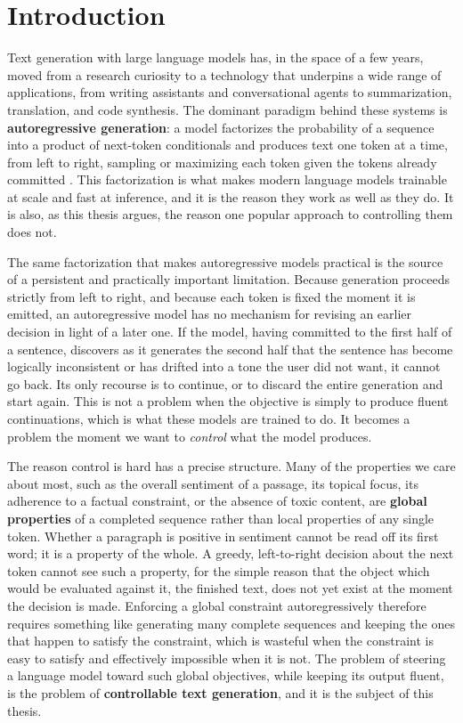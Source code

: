 \section{Introduction}
\label{ch:introduction}

Text generation with large language models has, in the space of a few years, moved from a research curiosity to a technology that underpins a wide range of applications, from writing assistants and conversational agents to summarization, translation, and code synthesis. The dominant paradigm behind these systems is \textbf{autoregressive generation}: a model factorizes the probability of a sequence into a product of next-token conditionals and produces text one token at a time, from left to right, sampling or maximizing each token given the tokens already committed \citep{radford2019language, brown2020language}. This factorization is what makes modern language models trainable at scale and fast at inference, and it is the reason they work as well as they do. It is also, as this thesis argues, the reason one popular approach to controlling them does not.

The same factorization that makes autoregressive models practical is the source of a persistent and practically important limitation. Because generation proceeds strictly from left to right, and because each token is fixed the moment it is emitted, an autoregressive model has no mechanism for revising an earlier decision in light of a later one. If the model, having committed to the first half of a sentence, discovers as it generates the second half that the sentence has become logically inconsistent or has drifted into a tone the user did not want, it cannot go back. Its only recourse is to continue, or to discard the entire generation and start again. This is not a problem when the objective is simply to produce fluent continuations, which is what these models are trained to do. It becomes a problem the moment we want to \emph{control} what the model produces.

The reason control is hard has a precise structure. Many of the properties we care about most, such as the overall sentiment of a passage, its topical focus, its adherence to a factual constraint, or the absence of toxic content, are \textbf{global properties} of a completed sequence rather than local properties of any single token. Whether a paragraph is positive in sentiment cannot be read off its first word; it is a property of the whole. A greedy, left-to-right decision about the next token cannot see such a property, for the simple reason that the object which would be evaluated against it, the finished text, does not yet exist at the moment the decision is made. Enforcing a global constraint autoregressively therefore requires something like generating many complete sequences and keeping the ones that happen to satisfy the constraint, which is wasteful when the constraint is easy to satisfy and effectively impossible when it is not. The problem of steering a language model toward such global objectives, while keeping its output fluent, is the problem of \textbf{controllable text generation}, and it is the subject of this thesis.

